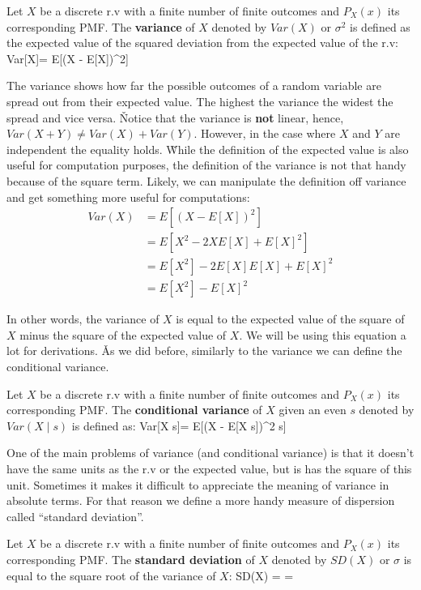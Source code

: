 \bd[Variance]
Let $X$ be a discrete r.v with a finite number of finite outcomes and $P_{X} (x)$ its corresponding PMF. The
\textbf{variance} of $X$ denoted by $Var(X)$ or $\sigma^2$ is defined as the expected value of the squared deviation
from the expected value of the r.v:
\bse
Var[X]= E[(X - E[X])^2]
\ese
\ed

The variance shows how far the possible outcomes of a random variable are spread out from their expected value. The
highest the variance the widest the spread and vice versa. \v

Notice that the variance is \textbf{not} linear, hence, $Var(X+Y) \neq Var(X) + Var(Y)$. However, in the case where $X$
and $Y$ are independent the equality holds. \v

While the definition of the expected value is also useful for computation purposes, the definition of the variance is
not that handy because of the square term. Likely, we can manipulate the definition off variance and get something
more useful for computations:
\begin{align*}
Var(X) &= E[(X - E[X])^{2}] \\ &= E[X^{2}-2XE[X]+E[X]^{2}] \\ &= E[X^{2}]-2E[X]E[X]+E[X]^{2} \\ &= E[X^{2}] - E[X]^{2}
\end{align*}

In other words, the variance of $X$ is equal to the expected value of the square of $X$ minus the square of the
expected value of $X$. We will be using this equation a lot for derivations. \v

As we did before, similarly to the variance we can define the conditional variance.

Let $X$ be a discrete r.v with a finite number of finite outcomes and $P_{X} (x)$ its corresponding PMF. The
\textbf{conditional variance} of $X$ given an even $s$ denoted by $Var(X \mid s)$ is defined as:
\bse
Var[X \mid s]= E[(X - E[X \mid s])^2 \mid s]
\ese
\ed

One of the main problems of variance (and conditional variance) is that it doesn't have the same units as the r.v or
the expected value, but is has the square of this unit. Sometimes it makes it difficult to appreciate the meaning of
variance in absolute terms. For that reason we define a more handy measure of dispersion called ``standard
deviation''.

Let $X$ be a discrete r.v with a finite number of finite outcomes and $P_{X} (x)$ its corresponding PMF. The
\textbf{standard deviation} of $X$ denoted by $SD(X)$ or $\sigma$ is equal to the square root of the variance of $X$:
\bse
SD(X) =  = 
\ese
\ed

